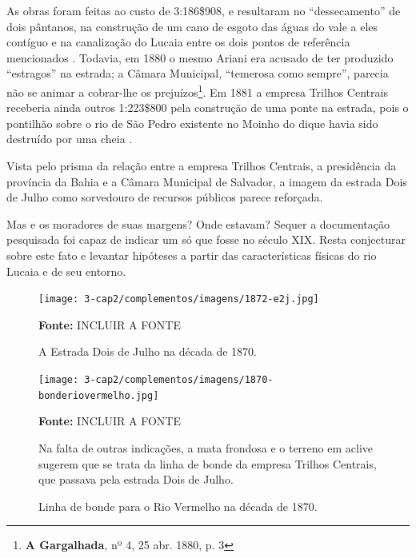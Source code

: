 As obras foram feitas ao custo de 3:186\$908, e resultaram no ``dessecamento'' de dois pântanos, na construção de um cano de esgoto das águas do vale a eles contíguo e na canalização do Lucaia entre os dois pontos de referência mencionados \cite[obras~publicas,~p.~9]{bahia_rpe_1880}. Todavia, em 1880 o mesmo Ariani era acusado de ter produzido ``estragos'' na estrada; a Câmara Municipal,  ``temerosa como sempre'', parecia não se animar a cobrar-lhe os prejuízos\footnote{\textbf{A Gargalhada}, nº 4, 25 abr. 1880, p. 3}. Em 1881 a empresa Trilhos Centrais receberia ainda outros 1:223\$800 pela construção de uma ponte na estrada, pois o pontilhão sobre o rio de São Pedro existente no Moinho do dique havia sido destruído por uma cheia \cite[obras~publicas,~pp.~8,~13]{bahia_rpe_1881}.

Vista pelo prisma da relação entre a empresa Trilhos Centrais, a presidência da província da Bahia e a Câmara Municipal de Salvador, a imagem da estrada Dois de Julho como sorvedouro de recursos públicos parece reforçada. 

Mas e os moradores de suas margens? Onde estavam? Sequer a documentação pesquisada foi capaz de indicar um só que fosse no século XIX. Resta conjecturar sobre este fato e levantar hipóteses a partir das características físicas do rio Lucaia e de seu entorno. 

\begin{figure}
\caption{A Estrada Dois de Julho na década de 1870.}
\centering
\texttt{[image: 3-cap2/complementos/imagens/1872-e2j.jpg]}{\footnotesize \par \textbf{Fonte:} INCLUIR A FONTE } 
\label{fig:1872-e2j}
\end{figure}

\begin{figure}
\caption{Linha de bonde para o Rio Vermelho na década de 1870.}
\centering
\texttt{[image: 3-cap2/complementos/imagens/1870-bonderiovermelho.jpg]}{\footnotesize \par \textbf{Fonte:} INCLUIR A FONTE \par Na falta de outras indicações, a mata frondosa e o terreno em aclive sugerem que se trata da linha de bonde da empresa Trilhos Centrais, que passava pela estrada Dois de Julho.} 
\label{fig:1870-bonderiovermelho}
\end{figure}

